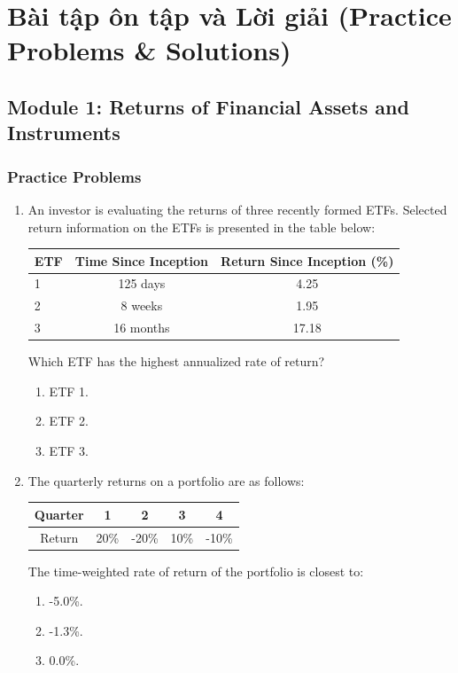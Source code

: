 \chapter{Bài tập ôn tập và Lời giải (Practice Problems \& Solutions)}
\label{chap:Practice Problems and Solutions}
\section{Module 1: Returns of Financial Assets and Instruments}
\label{sec:app_Problems_M1}

\subsection{Practice Problems}
\label{subsec:app_Problems_M1}

\begin{enumerate}
	\item An investor is evaluating the returns of three recently formed ETFs. Selected return information on the ETFs is presented in the table below:
	      \begin{center}
	      \begin{tabular}{l  c  c}
		      \toprule
		      \textbf{ETF} & \textbf{Time Since Inception} & \textbf{Return Since Inception (\%)} \\
		      \midrule
		      1 & 125 days & 4.25 \\
		      2 & 8 weeks & 1.95 \\
		      3 & 16 months & 17.18 \\
		      \bottomrule
	      \end{tabular}
	      \end{center}
	      Which ETF has the highest annualized rate of return?
	      \begin{enumerate}[label=\Alph*.]
		      \item ETF 1.
		      \item ETF 2.
		      \item ETF 3.
	      \end{enumerate}

	\item The quarterly returns on a portfolio are as follows:
	      \begin{center}
	      \begin{tabular}{c  c  c  c  c}
		      \toprule
		      \textbf{Quarter} & \textbf{1} & \textbf{2} & \textbf{3} & \textbf{4} \\
		      \midrule
		      Return & 20\% & -20\% & 10\% & -10\% \\
		      \bottomrule
	      \end{tabular}
	      \end{center}
	      The time-weighted rate of return of the portfolio is closest to:
	      \begin{enumerate}[label=\Alph*.]
		      \item -5.0\%.
		      \item -1.3\%.
		      \item 0.0\%.
	      \end{enumerate}


\end{enumerate}
